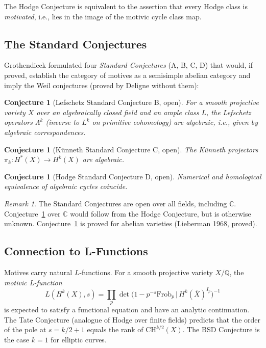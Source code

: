 \documentclass[12pt,a4paper]{amsart}
\newtheorem{conjecture}[theorem]{Conjecture}
\theoremstyle{definition}
\theoremstyle{remark}
\newtheorem{remark}[theorem]{Remark}
\begin{document}
The Hodge Conjecture is equivalent to the assertion that every Hodge class is
\emph{motivated}, i.e., lies in the image of the motivic cycle class map.

\subsection{The Standard Conjectures}

Grothendieck formulated four \emph{Standard Conjectures} (A, B, C, D) that would,
if proved, establish the category of motives as a semisimple abelian category and
imply the Weil conjectures (proved by Deligne without them):

\begin{conjecture}[Lefschetz Standard Conjecture B, open]
\label{conj:std-b}
For a smooth projective variety $X$ over an algebraically closed field and an ample
class $L$, the Lefschetz operators $\Lambda^k$ (inverse to $L^k$ on primitive cohomology)
are algebraic, i.e., given by algebraic correspondences.
\end{conjecture}

\begin{conjecture}[Künneth Standard Conjecture C, open]
\label{conj:std-c}
The K\"unneth projectors $\pi_k: H^*(X) \to H^k(X)$ are algebraic.
\end{conjecture}

\begin{conjecture}[Hodge Standard Conjecture D, open]
\label{conj:std-d}
Numerical and homological equivalence of algebraic cycles coincide.
\end{conjecture}

\begin{remark}
The Standard Conjectures are open over all fields, including $\mathbb{C}$.
Conjecture~\ref{conj:std-b} over $\mathbb{C}$ would follow from the Hodge Conjecture,
but is otherwise unknown. Conjecture~\ref{conj:std-d} is proved for abelian varieties
(Lieberman 1968, proved).
\end{remark}

\subsection{Connection to L-Functions}

Motives carry natural $L$-functions. For a smooth projective variety $X/\mathbb{Q}$,
the \emph{motivic L-function}
\[
  L(H^k(X), s) = \prod_p \det\bigl(1 - p^{-s} \mathrm{Frob}_p \,|\, H^k(\bar X)^{I_p}\bigr)^{-1}
\]
is expected to satisfy a functional equation and have an analytic continuation.
The Tate Conjecture (analogue of Hodge over finite fields) predicts that the
order of the pole at $s = k/2 + 1$ equals the rank of $\mathrm{CH}^{k/2}(X)$.
The BSD Conjecture is the case $k = 1$ for elliptic curves.
\end{document}
